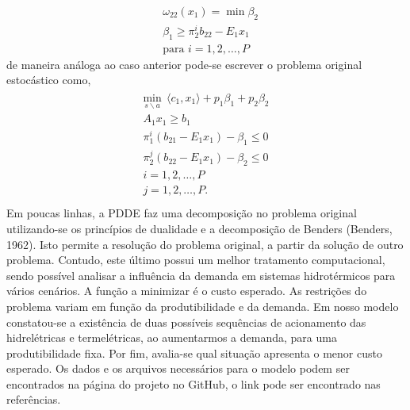 \documentclass[12pt,fleqn]{article}
\begin{document}
{\setlength{\abovedisplayskip}{-10pt}
\begin{align*}
 &\omega_{22}(x_1) = \min \beta_{2}\nonumber \\
&\beta_{1}  \geq {\pi}_{2}^{i}b_{22} - E_1 x_1 \nonumber\\
&\mbox{para }i = 1,2,\dots, P 
\end{align*}}%
de maneira an\'aloga ao caso anterior pode-se escrever o problema original estoc\'astico como,
 \begin{align*}
 \begin{aligned}
	\underset {s \backslash a} {\text{min}} \ \ \langle c_1,x_1\rangle + p_1 {\beta}_{1} + p_2 {\beta}_{2} \\
	A_1 x_1 \geq b_1 \\
	{\pi}_{1}^{i}(b_{21} - E_1x_1) - {\beta}_{1} \leq 0 \\ 
	{\pi}_{2}^{j}(b_{22} - E_1x_1) - {\beta}_{2} \leq 0 \\ 
	i = 1, 2, \dots , P \\
	j = 1, 2, \dots , P. \\
  \end{aligned}
  \label{pd5}
\end{align*}
Em poucas linhas, a PDDE faz uma decomposi\c c\~ao no problema original utilizando-se os princ\'ipios de dualidade e a decomposi\c c\~ao
de Benders (Benders, 1962). Isto permite a resolu\c c\~ao do problema original, a partir da solu\c c\~ao de outro
problema. Contudo, este
\'ultimo possui um melhor tratamento computacional, sendo poss\'ivel analisar a influ\^encia da demanda em sistemas
hidrot\'ermicos para v\'arios cen\'arios. A fun\c c\~ao a minimizar  \'e o custo esperado. As restri\c c\~oes do
problema variam em fun\c c\~ao da produtibilidade e da demanda. Em nosso modelo  constatou-se a exist\^encia de duas poss\'iveis sequ\^encias de acionamento das hidrel\'etricas e termel\'etricas, ao aumentarmos a demanda, para uma produtibilidade fixa. Por fim, avalia-se qual situa\c c\~ao apresenta o menor custo esperado. Os dados e os arquivos necessários para o modelo podem ser encontrados na p\'agina do projeto no GitHub, o link pode ser encontrado nas refer\^encias.
\end{document}
